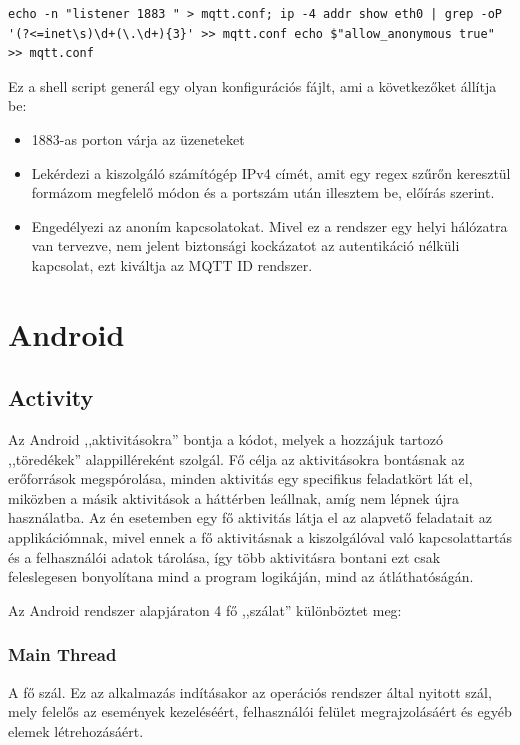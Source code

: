 \documentclass[
]{thesis-ekf}
\theoremstyle{definition}
\theoremstyle{remark}
\begin{document}
\lstset{language=bash} 
\label{configGenerator}
\begin{lstlisting}[frame=single]
echo -n "listener 1883 " > mqtt.conf; ip -4 addr show eth0 | grep -oP '(?<=inet\s)\d+(\.\d+){3}' >> mqtt.conf echo $"allow_anonymous true" >> mqtt.conf
\end{lstlisting}

Ez a shell script generál egy olyan konfigurációs fájlt, ami a következőket állítja be:
\begin{itemize}
	\item 1883-as porton várja az üzeneteket
	\item Lekérdezi a kiszolgáló számítógép IPv4 címét, amit egy regex szűrőn keresztül formázom megfelelő módon és a portszám után illesztem be, előírás szerint.
	\item Engedélyezi az anoním kapcsolatokat. Mivel ez a rendszer egy helyi hálózatra van tervezve, nem jelent biztonsági kockázatot az autentikáció nélküli kapcsolat, ezt kiváltja az MQTT ID rendszer.
\end{itemize}

\section{Android}
\subsection{Activity}
Az Android ,,aktivitásokra'' bontja a kódot, melyek a hozzájuk tartozó ,,töredékek'' alappilléreként szolgál.
Fő célja az aktivitásokra bontásnak az erőforrások megspórolása, minden aktivitás egy specifikus feladatkört lát el, 
miközben a másik aktivitások a háttérben leállnak, amíg nem lépnek újra használatba. Az én esetemben egy fő aktivitás
látja el az alapvető feladatait az applikációmnak, mivel ennek a fő aktivitásnak a kiszolgálóval való kapcsolattartás és
a felhasználói adatok tárolása, így több aktivitásra bontani ezt csak feleslegesen bonyolítana mind a program logikáján,
mind az átláthatóságán.

Az Android rendszer alapjáraton 4 fő ,,szálat'' különböztet meg:
\subsubsection{Main Thread}
A fő szál. Ez az alkalmazás indításakor az operációs rendszer által nyitott szál, mely felelős az események kezeléséért,
felhasználói felület megrajzolásáért és egyéb elemek létrehozásáért.
	
\end{document}
